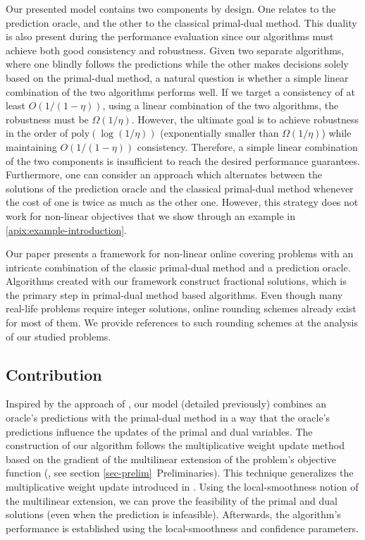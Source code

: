 Our presented model contains two components by design. One relates to the prediction oracle, and the other to the classical primal-dual method. This duality is also present during the performance evaluation since our algorithms must achieve both good consistency and robustness. Given two separate algorithms, where one blindly follows the predictions while the other makes decisions solely based on the primal-dual method, a natural question is whether a simple linear combination of the two algorithms performs well. If we target a consistency of at least $O(1/(1-\eta))$, using a linear combination of the two algorithms, the robustness must be $\Omega(1/\eta)$. However, the ultimate goal is to achieve robustness in the order of $\text{poly}(\log(1/\eta))$ (exponentially smaller than $\Omega(1/\eta)$) while maintaining $O(1/(1-\eta))$ consistency. Therefore, a simple linear combination of the two components is insufficient to reach the desired performance guarantees. Furthermore, one can consider an approach which alternates between the solutions of the prediction oracle and the classical primal-dual method whenever the cost of one is twice as much as the other one. However, this strategy does not work for non-linear objectives that we show through an example in \cref{apix:example-introduction}.

Our paper presents a framework for non-linear online covering problems with an intricate combination of the classic primal-dual method and a prediction oracle. Algorithms created with our framework construct fractional solutions, which is the primary step in primal-dual method based algorithms. Even though many real-life problems require integer solutions, online rounding schemes already exist for most of them.   We provide references to such rounding schemes at the analysis of our studied problems.


\subsection{Contribution}  \label{sec:intro-covering}

Inspired by the approach of \cite{BamasMaggiori20:The-Primal-Dual-method}, our model (detailed previously) combines an oracle's predictions with the primal-dual method in a way that the oracle's predictions influence the updates of the primal and dual variables. The construction of our algorithm follows the multiplicative weight update method based on the gradient of the multilinear extension of the problem's objective function (\cite{Thang20:Online-Primal-Dual}, see section \ref{sec-prelim}~Preliminaries). This technique generalizes the multiplicative weight update introduced in \cite{BuchbinderNaor09:The-Design-of-Competitive,AzarBuchbinder16:Online-Algorithms}. Using the local-smoothness notion of the multilinear extension, we can prove the feasibility of the primal and dual solutions (even when the prediction is infeasible). Afterwards, the algorithm's performance is established using the local-smoothness and confidence parameters.



